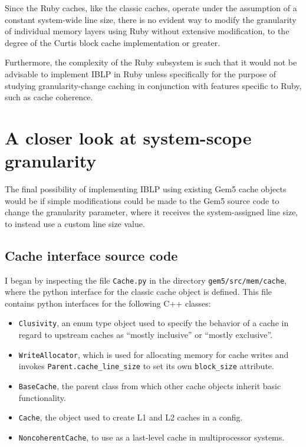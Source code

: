 \documentclass[12pt,twoside]{reedthesis}
\begin{document}
	Since the Ruby caches, like the classic caches, operate under the assumption of a constant system-wide line size, there is no evident way to modify the granularity of individual memory layers using Ruby without extensive modification, to the degree of the Curtis block cache implementation or greater.

	Furthermore, the complexity of the Ruby subsystem is such that it would not be advisable to implement IBLP in Ruby unless specifically for the purpose of studying granularity-change caching in conjunction with features specific to Ruby, such as cache coherence.


\section{A closer look at system-scope granularity}

	The final possibility of implementing IBLP using existing Gem5 cache objects would be if simple modifications could be made to the Gem5 source code to change the granularity parameter, where it receives the system-assigned line size, to instead use a custom line size value.

	\subsection*{Cache interface source code}

	I began by inspecting the file \verb`Cache.py` in the directory \verb`gem5/src/mem/cache`, where the python interface for the classic cache object is defined. This file contains python interfaces for the following C++ classes:
	\begin{itemize}
		\item \verb`Clusivity`, an enum type object used to specify the behavior of a cache in regard to upstream caches as ``mostly inclusive'' or ``mostly exclusive''.
		\item \verb`WriteAllocator`, which is used for allocating memory for cache writes and invokes \verb`Parent.cache_line_size` to set its own \verb`block_size` attribute.
		\item \verb`BaseCache`, the parent class from which other cache objects inherit basic functionality.
		\item \verb`Cache`, the object used to create L1 and L2 caches in a config.
		\item \verb`NoncoherentCache`, to use as a last-level cache in multiprocessor systems.
	\end{itemize}
\end{document}
